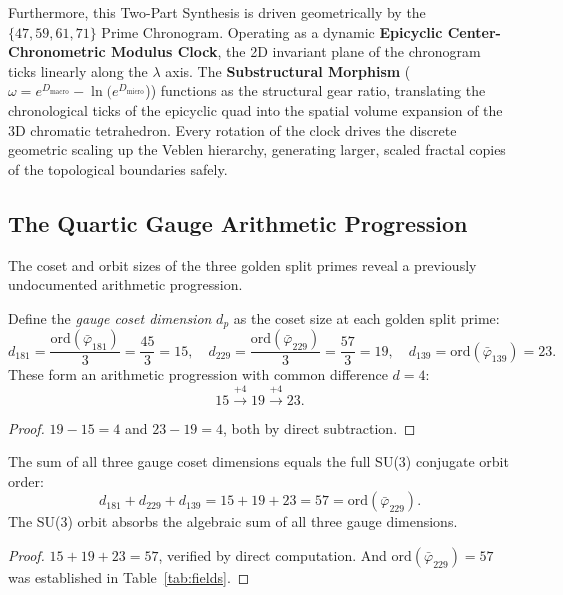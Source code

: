 Furthermore, this Two-Part Synthesis is driven geometrically by the $\{47, 59, 61, 71\}$ Prime Chronogram. Operating as a dynamic \textbf{Epicyclic Center-Chronometric Modulus Clock}, the 2D invariant plane of the chronogram ticks linearly along the $\lambda$ axis. The \textbf{Substructural Morphism} ($\omega = e^{D_{\text{macro}}} - \ln(e^{D_{\text{micro}}}$)) functions as the structural gear ratio, translating the chronological ticks of the epicyclic quad into the spatial volume expansion of the 3D chromatic tetrahedron. Every rotation of the clock drives the discrete geometric scaling up the Veblen hierarchy, generating larger, scaled fractal copies of the topological boundaries safely.

\subsection{The Quartic Gauge Arithmetic Progression}
\label{sec:quartic_gauge}

The coset and orbit sizes of the three golden split primes reveal a previously undocumented arithmetic progression.

\begin{theorem}
\label{thm:quartic}
Define the \emph{gauge coset dimension} $d_p$ as the coset size at each golden split prime:
\[
d_{181} = \frac{\mathrm{ord}(\bar\varphi_{181})}{3} = \frac{45}{3} = 15, \quad
d_{229} = \frac{\mathrm{ord}(\bar\varphi_{229})}{3} = \frac{57}{3} = 19, \quad
d_{139} = \mathrm{ord}(\bar\varphi_{139}) = 23.
\]
These form an arithmetic progression with common difference $d = 4$:
\[
15 \xrightarrow{+4} 19 \xrightarrow{+4} 23.
\]
\end{theorem}

\begin{proof}
$19 - 15 = 4$ and $23 - 19 = 4$, both by direct subtraction. \qedhere
\end{proof}

\begin{theorem}
\label{thm:master_sum}
The sum of all three gauge coset dimensions equals the full SU(3) conjugate orbit order:
\[
d_{181} + d_{229} + d_{139} = 15 + 19 + 23 = 57 = \mathrm{ord}(\bar\varphi_{229}).
\]
The SU(3) orbit absorbs the algebraic sum of all three gauge dimensions.
\end{theorem}

\begin{proof}
$15 + 19 + 23 = 57$, verified by direct computation. And $\mathrm{ord}(\bar\varphi_{229}) = 57$ was established in Table~\ref{tab:fields}. \qedhere
\end{proof}

